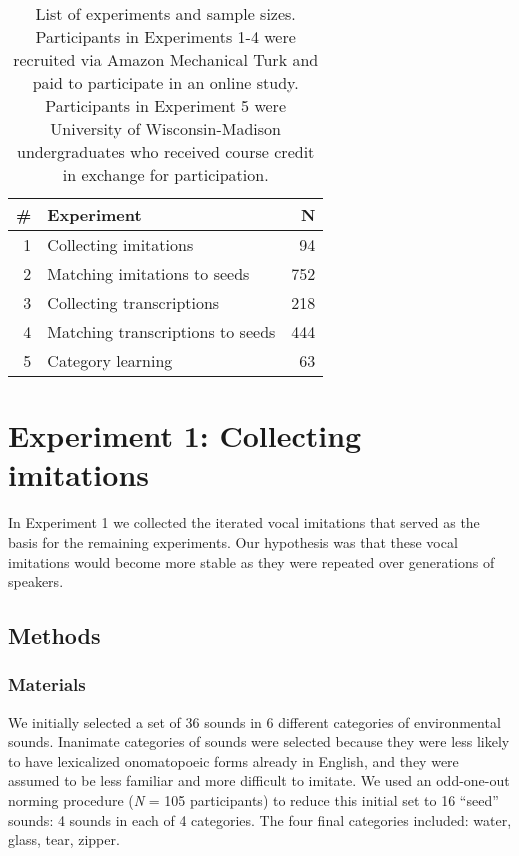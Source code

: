 \documentclass[10pt,letterpaper]{article}
\begin{document}
\begin{table}

\caption{\label{tab:table1}List of experiments and sample sizes. Participants in Experiments 1-4 were recruited via Amazon Mechanical Turk and paid to participate in an online study. Participants in Experiment 5 were University of Wisconsin-Madison undergraduates who received course credit in exchange for participation.}
\centering
\begin{tabular}[t]{rlr}
\toprule
\# & Experiment & N\\
\midrule
1 & Collecting imitations & 94\\
2 & Matching imitations to seeds & 752\\
3 & Collecting transcriptions & 218\\
4 & Matching transcriptions to seeds & 444\\
5 & Category learning & 63\\
\bottomrule
\end{tabular}
\end{table}

\section{Experiment 1: Collecting
imitations}\label{experiment-1-collecting-imitations}

In Experiment 1 we collected the iterated vocal imitations that served
as the basis for the remaining experiments. Our hypothesis was that
these vocal imitations would become more stable as they were repeated
over generations of speakers.

\subsection{Methods}\label{methods}

\subsubsection{Materials}\label{materials}

We initially selected a set of 36 sounds in 6 different categories of
environmental sounds. Inanimate categories of sounds were selected
because they were less likely to have lexicalized onomatopoeic forms
already in English, and they were assumed to be less familiar and more
difficult to imitate. We used an odd-one-out norming procedure (\emph{N}
= 105 participants) to reduce this initial set to 16 ``seed'' sounds: 4
sounds in each of 4 categories. The four final categories included:
water, glass, tear, zipper.
\end{document}
